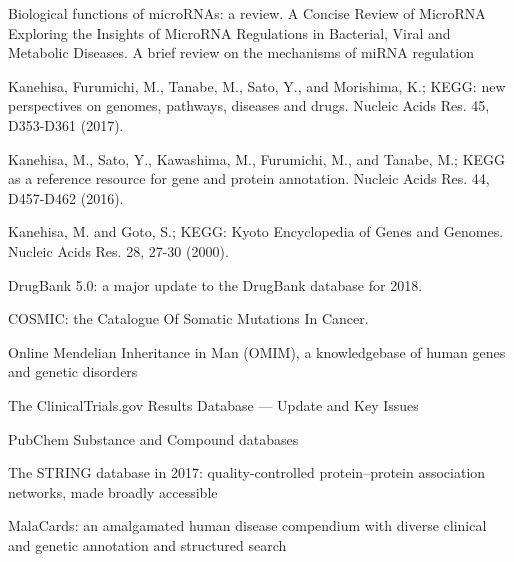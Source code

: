 
\begin{thebibliography}{00}

 Biological functions of microRNAs: a review.
 A Concise Review of MicroRNA Exploring the Insights of MicroRNA Regulations in Bacterial, Viral and Metabolic Diseases.
 A brief review on the mechanisms of miRNA regulation

 Kanehisa, Furumichi, M., Tanabe, M., Sato, Y., and Morishima, K.; 
\newblock KEGG: new perspectives on genomes, pathways, diseases and drugs. 
\newblock Nucleic Acids Res. 45, D353-D361 (2017).

 Kanehisa, M., Sato, Y., Kawashima, M., Furumichi, M., and Tanabe, M.; 
\newblock KEGG as a reference resource for gene and protein annotation. 
\newblock Nucleic Acids Res. 44, D457-D462 (2016).

 Kanehisa, M. and Goto, S.; 
\newblock KEGG: Kyoto Encyclopedia of Genes and Genomes. 
\newblock Nucleic Acids Res. 28, 27-30 (2000). 

 DrugBank 5.0: a major update to the DrugBank database for 2018.

 COSMIC: the Catalogue Of Somatic Mutations In Cancer.

 Online Mendelian Inheritance in Man (OMIM), a knowledgebase of human genes and genetic disorders

 The ClinicalTrials.gov Results Database — Update and Key Issues

 PubChem Substance and Compound databases

 The STRING database in 2017: quality-controlled protein–protein association networks, made broadly accessible

 MalaCards: an amalgamated human disease compendium with diverse clinical and genetic annotation and structured search

\end{thebibliography}

